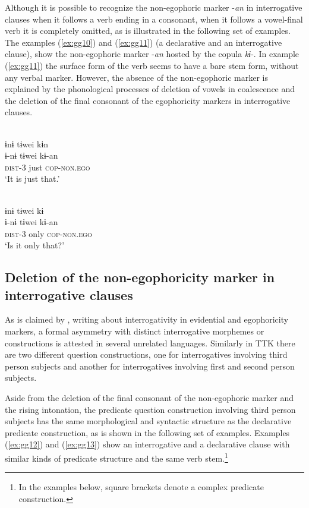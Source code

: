\documentclass[output=paper]{langsci/langscibook}
\begin{document}
Although it is possible to recognize the non-egophoric marker -\textit{an} in interrogative clauses when it follows a verb ending in a consonant, when it follows a vowel-final verb it is completely omitted, as is illustrated in the following set of examples. The examples (\ref{ex:gg10}) and (\ref{ex:gg11}) (a declarative and an interrogative clause), show the non-egophoric marker -\textit{an} hosted by the copula \textit{kɨ}-. In example (\ref{ex:gg11}) the surface form of the verb seems to have a bare stem form, without any verbal marker. However, the absence of the non-egophoric marker is explained by the phonological processes of deletion of vowels in coalescence and the deletion of the final consonant of the egophoricity markers in interrogative clauses. 

\ea \label{ex:gg10}
    \\
	\glll ɨnɨ	tɨwei	kɨn\\
	ɨ-nɨ tɨwei	kɨ-an\\
      \textsc{dist}-3 just \textsc{cop-non.ego}\\
	\glt ‘It is just that.’
	\z
	
	
\ea \label{ex:gg11}
    \\
	\glll ɨnɨ	tɨwei	kɨ\\
	ɨ-nɨ tɨwei	kɨ-an\\
      \textsc{dist}-3 only \textsc{cop-non.ego}\\
	\glt ‘Is it only that?’
	\z


\subsection{Deletion of the non-egophoricity marker in interrogative clauses}\label{s:gg1-3}

As is claimed by \citet{SanRoque2018}, writing about interrogativity in evidential and egophoricity markers, a formal asymmetry with distinct interrogative morphemes or constructions is attested in several unrelated languages. Similarly in TTK there are two different question constructions, one for interrogatives involving third person subjects and another for interrogatives involving first and second person subjects.

Aside from the deletion of the final consonant of the non-egophoric marker and the rising intonation, the predicate question construction involving third person subjects has the same morphological and syntactic structure as the declarative predicate construction, as is shown in the following set of examples. Examples (\ref{ex:gg12}) and (\ref{ex:gg13}) show an interrogative and a declarative clause with similar kinds of predicate structure and the same verb stem.\footnote{In the examples below, square brackets denote a complex predicate construction.} 
\end{document}
